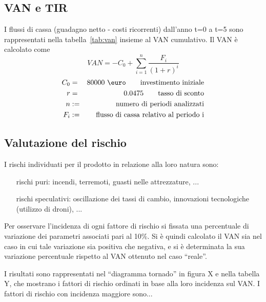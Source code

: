 
\subsection{VAN e TIR}
I flussi di cassa (guadagno netto - costi ricorrenti) dall’anno t=0 a t=5 sono
rappresentati nella tabella~\ref{tab:van} insieme al VAN cumulativo.
Il VAN è calcolato come 	
\begin{displaymath}
VAN = - C_0 + \sum_{i=1}^n \frac{F_i}{(1 + r)^i}
\end{displaymath}
\begin{eqnarray*}
C_0 &=& 80000 \ \mbox{\euro} \qquad \mbox{investimento iniziale} \\
r &=& 0.0475 \qquad \mbox{tasso di sconto} \\
n &:=& \mbox{numero di periodi analizzati} \\
F_i &:=& \mbox{flusso di cassa relativo al periodo i}
\end{eqnarray*}

\subsection{Valutazione del rischio}
I rischi individuati per il prodotto in relazione alla loro natura sono:
\begin{itemize}
\item [rischi puri:] incendi, terremoti, guasti nelle attrezzature, ...
\item [rischi speculativi:] oscillazione dei tassi di cambio, innovazioni
tecnologiche (utilizzo di droni), ...
\end{itemize}

Per osservare l’incidenza di ogni fattore di rischio si fissata una
percentuale di variazione dei parametri associati pari al 10\%. Si è quindi
calcolato il VAN sia nel caso in cui tale variazione sia positiva che negativa,
e si è determinata la sua variazione percentuale rispetto al VAN ottenuto nel
caso “reale”.

I risultati sono rappresentati nel “diagramma tornado” in figura X e nella
tabella Y, che mostrano i fattori di rischio ordinati in base alla loro
incidenza sul VAN. I fattori di rischio con incidenza maggiore sono...

